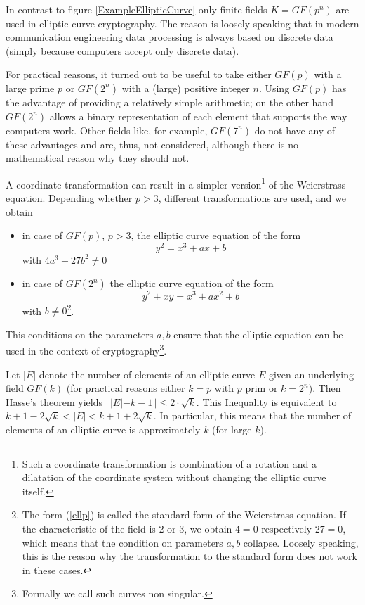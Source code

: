 In contrast to figure \ref{ExampleEllipticCurve} only finite fields $K=GF(p^n)$ are used in elliptic curve cryptography. The reason is loosely speaking that in modern communication engineering data processing is always based on discrete data (simply because computers accept only discrete data).

For practical reasons, it turned out to be useful to take either $GF(p)$ with a large prime $p$ or $GF(2^n)$ with a (large) positive integer $n$. Using $GF(p)$ has the advantage of providing a relatively simple arithmetic; on the other hand $GF(2^n)$ allows a binary representation of each element that supports the way computers work. Other fields like, for example, $GF(7^n)$ do not have any of these advantages and are, thus, not considered, although there is no mathematical reason why they should not.

A coordinate transformation can result in a simpler version\footnote{Such a coordinate transformation is combination of a rotation and a dilatation of the coordinate system without changing the elliptic curve itself.} of the Weierstrass equation. Depending whether $p>3$, different transformations are used, and we obtain
\begin{itemize}
\item in case of $GF(p)$, $p>3$, the elliptic curve equation of the form
\begin{equation}
 y^2 = x^3 + ax + b
\label{ellp}
\end{equation}
with $4a^3+27b^2\ne 0$
\item in case of $GF(2^n)$ the elliptic curve equation of the form 
\begin{equation}
 y^2+xy = x^3 + ax^2 + b
\label{ell2}
\end{equation}
with $b\ne 0$\footnote{The form (\ref{ellp}) is called the standard form of the Weierstrass-equation. If the characteristic of the field is $2$ or $3$, we obtain $4=0$ respectively $27=0$, which means that the condition on parameters $a,b$ collapse. Loosely speaking, this is the reason why the transformation to the standard form does not work in these cases.}.
\end{itemize}
This conditions on the parameters $a,b$ ensure that the elliptic equation can be used in the context of cryptography\footnote{Formally we call such curves non singular.}.

Let $|E|$ denote the number of elements of an elliptic curve $E$ given an underlying field $GF(k)$ (for practical reasons either $k=p$ with $p$ prim or $k=2^n$). Then Hasse's theorem\cite{Silverman1986} yields $| \, |E| - k-1\,| \le 2\cdot \sqrt{k}$. This Inequality is equivalent to $k+1 - 2\sqrt{k} < |E| < k+1+2\sqrt{k}$. In particular, this means that the number of elements of an elliptic curve is approximately $k$ (for large $k$). 


